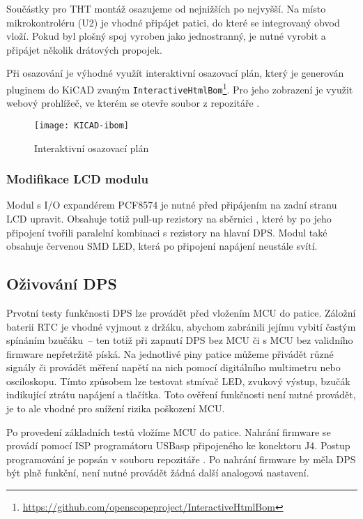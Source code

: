 Součástky pro THT montáž osazujeme od nejnižších po nejvyšší. Na místo
mikrokontroléru (U2) je vhodné připájet patici, do které se integrovaný obvod
vloží. Pokud byl plošný spoj vyroben jako jednostranný, je nutné vyrobit
a připájet několik drátových propojek.

Při osazování je výhodné využít interaktivní osazovací plán, který je generován
pluginem do KiCAD zvaným
\texttt{InteractiveHtmlBom}\footnote{\url{https://github.com/openscopeproject/InteractiveHtmlBom}}.
Pro jeho zobrazení je využit webový prohlížeč, ve kterém se otevře soubor
 z repozitáře .

\begin{figure}[htbp]
    \centering
    \texttt{[image: KICAD-ibom]}
    \caption{Interaktivní osazovací plán}
    \label{fig:PCB ibom}
\end{figure}


\subsubsection{Modifikace LCD modulu}
Modul s I/O expandérem PCF8574 je nutné před připájením na zadní stranu LCD
upravit. Obsahuje totiž pull-up rezistory na sběrnici \IIC{}, které by po jeho
připojení tvořili paralelní kombinaci s rezistory na hlavní DPS. Modul také
obsahuje červenou SMD LED, která po připojení napájení neustále svítí.


\subsection{Oživování DPS}
Prvotní testy funkčnosti DPS lze provádět před vložením MCU do patice. Záložní
baterii RTC je vhodné vyjmout z držáku, abychom zabránili jejímu vybití častým
spínáním bzučáku~-- ten totiž při zapnutí DPS bez MCU či s MCU bez validního
firmware nepřetržitě píská. Na jednotlivé piny patice můžeme přivádět různé
signály či provádět měření napětí na nich pomocí digitálního multimetru nebo
osciloskopu. Tímto způsobem lze testovat stmívač LED, zvukový výstup, bzučák
indikující ztrátu napájení a tlačítka. Toto ověření funkčnosti není nutné
provádět, je to ale vhodné pro snížení rizika poškození MCU.

Po provedení základních testů vložíme MCU do patice. Nahrání firmware se
provádí pomocí ISP programátoru USBasp připojeného ke konektoru J4. Postup
programování je popsán v souboru  repozitáře
. Po nahrání firmware by měla DPS být plně funkční, není
nutné provádět žádná další analogová nastavení.
